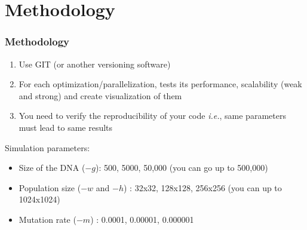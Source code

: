 \documentclass{beamer}
\begin{document}
\section{Methodology}
\begin{frame}
 \frametitle{Methodology}
\begin{enumerate}
 \item Use GIT (or another versioning software)
 \item For each optimization/parallelization, tests its performance, scalability (weak and strong) and create visualization of them
 \item You need to verify the reproducibility of your code \textit{i.e.}, same parameters must lead to same results
\end{enumerate}
\vfill
Simulation parameters:
\begin{itemize}
 \item Size of the DNA ($-g$): 500, 5000, 50,000 (you can go up to 500,000)
 \item Population size ($-w$ and $-h$) : 32x32, 128x128, 256x256 (you can up to 1024x1024)
 \item Mutation rate ($-m$) : 0.0001, 0.00001, 0.000001
\end{itemize}
 \end{frame}
\end{document}
